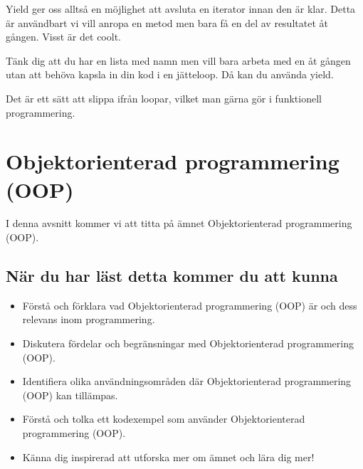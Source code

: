 \begin{Shaded}
\begin{Highlighting}[]
\end{Highlighting}
\end{Shaded}

Yield ger oss alltså en möjlighet att avsluta en iterator innan den är
klar. Detta är användbart vi vill anropa en metod men bara få en del av
resultatet åt gången. Visst är det coolt.

Tänk dig att du har en lista med namn men vill bara arbeta med en åt
gången utan att behöva kapsla in din kod i en jätteloop. Då kan du
använda yield.

Det är ett sätt att slippa ifrån loopar, vilket man gärna gör i
funktionell programmering.

\hypertarget{objektorienterad-programmering-oop}{%
\section{Objektorienterad programmering
(OOP)}\label{objektorienterad-programmering-oop}}

I denna avsnitt kommer vi att titta på ämnet Objektorienterad
programmering (OOP).

\hypertarget{nuxe4r-du-har-luxe4st-detta-kommer-du-att-kunna}{%
\subsection{När du har läst detta kommer du att
kunna}\label{nuxe4r-du-har-luxe4st-detta-kommer-du-att-kunna}}

\begin{itemize}
\tightlist
\item
  Förstå och förklara vad Objektorienterad programmering (OOP) är och
  dess relevans inom programmering.
\item
  Diskutera fördelar och begränsningar med Objektorienterad
  programmering (OOP).
\item
  Identifiera olika användningsområden där Objektorienterad
  programmering (OOP) kan tillämpas.
\item
  Förstå och tolka ett kodexempel som använder Objektorienterad
  programmering (OOP).
\item
  Känna dig inspirerad att utforska mer om ämnet och lära dig mer!
\end{itemize}

